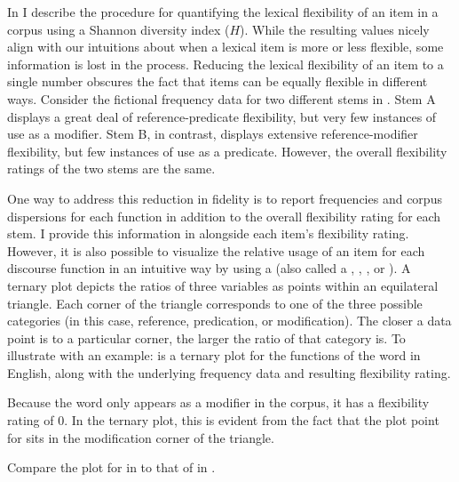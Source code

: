In  I describe the procedure for quantifying the lexical flexibility of an item in a corpus using a Shannon diversity index ($H$). While the resulting values nicely align with our intuitions about when a lexical item is more or less flexible, some information is lost in the process. Reducing the lexical flexibility of an item to a single number obscures the fact that items can be equally flexible in different ways. Consider the fictional frequency data for two different stems in . Stem A displays a great deal of reference-predicate flexibility, but very few instances of use as a modifier. Stem B, in contrast, displays extensive reference-modifier flexibility, but few instances of use as a predicate. However, the overall flexibility ratings of the two stems are the same.


One way to address this reduction in fidelity is to report frequencies and corpus dispersions for each function in addition to the overall flexibility rating for each stem. I provide this information in  alongside each item's flexibility rating. However, it is also possible to visualize the relative usage of an item for each discourse function in an intuitive way by using a  (also called a , , , or ). A ternary plot depicts the ratios of three variables as points within an equilateral triangle. Each corner of the triangle corresponds to one of the three possible categories (in this case, reference, predication, or modification). The closer a data point is to a particular corner, the larger the ratio of that category is. To illustrate with an example:  is a ternary plot for the functions of the word  in English, along with the underlying frequency data and resulting flexibility rating.


\noindent Because the word  only appears as a modifier in the corpus, it has a flexibility rating of $0$. In the ternary plot, this is evident from the fact that the plot point for  sits in the modification corner of the triangle.

Compare the plot for  in  to that of  in .

